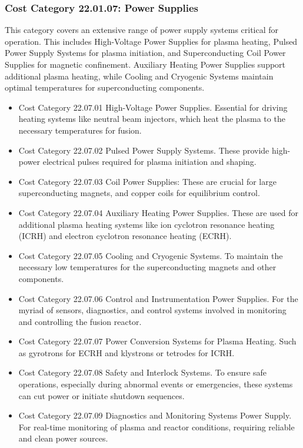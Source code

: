 
\subsubsection*{Cost Category 22.01.07: Power Supplies}

This category covers an extensive range of power supply systems critical for operation. This includes High-Voltage Power Supplies for plasma heating, Pulsed Power Supply Systems for plasma initiation, and Superconducting Coil Power Supplies for magnetic confinement. Auxiliary Heating Power Supplies support additional plasma heating, while Cooling and Cryogenic Systems maintain optimal temperatures for superconducting components. 


\begin{itemize}
    \item Cost Category 22.07.01 High-Voltage Power Supplies. Essential for driving heating systems like neutral beam injectors, which heat the plasma to the necessary temperatures for fusion.
    \item Cost Category 22.07.02 Pulsed Power Supply Systems. These provide high-power electrical pulses required for plasma initiation and shaping.
    \item Cost Category 22.07.03 Coil Power Supplies: These are crucial for large superconducting magnets, and copper coils for equilibrium control.
    \item Cost Category 22.07.04 Auxiliary Heating Power Supplies. These are used for additional plasma heating systems like ion cyclotron resonance heating (ICRH) and electron cyclotron resonance heating (ECRH).
    \item Cost Category 22.07.05 Cooling and Cryogenic Systems. To maintain the necessary low temperatures for the superconducting magnets and other components.
    \item Cost Category 22.07.06 Control and Instrumentation Power Supplies. For the myriad of sensors, diagnostics, and control systems involved in monitoring and controlling the fusion reactor.
    \item Cost Category 22.07.07 Power Conversion Systems for Plasma Heating. Such as gyrotrons for ECRH and klystrons or tetrodes for ICRH.
    \item Cost Category 22.07.08 Safety and Interlock Systems. To ensure safe operations, especially during abnormal events or emergencies, these systems can cut power or initiate shutdown sequences.
    \item Cost Category  22.07.09 Diagnostics and Monitoring Systems Power Supply. For real-time monitoring of plasma and reactor conditions, requiring reliable and clean power sources.
\end{itemize}

